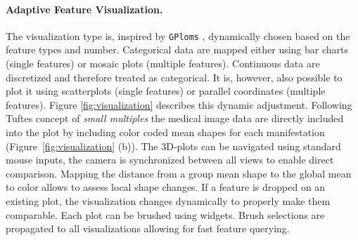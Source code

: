 \documentclass[journal]{style/vgtc} 			          %
\begin{document}
\paragraph{Adaptive Feature Visualization.} \label{sec:AdaptiveFeatureVisualization}
The visualization type is, inspired by \texttt{GPloms} \cite{Francois2013}, dynamically chosen based on the feature types and number.
%
Categorical data are mapped either using bar charts (single features) or mosaic plots (multiple features).
%
Continuous data are discretized and therefore treated as categorical.
%
It is, however, also possible to plot it using scatterplots (single features) or parallel coordinates (multiple features).
%
Figure \ref{fig:visualization} describes this dynamic adjustment.
%
Following Tuftes concept of \emph{small multiples} \cite{Tufte1983} the medical image data are directly included into the plot by including color coded mean shapes for each manifestation (Figure~\ref{fig:visualization} (b)).
%
The 3D-plots can be navigated using standard mouse inputs, the camera is synchronized between all views to enable direct comparison.
%
Mapping the distance from a group mean shape to the global mean to color allows to assess local shape changes.
If a feature is dropped on an existing plot, the visualization changes dynamically to properly make them comparable. 
%
Each plot can be brushed using widgets.
%
Brush selections are propagated to all visualizations allowing for fast feature querying.
%
%
\end{document}
